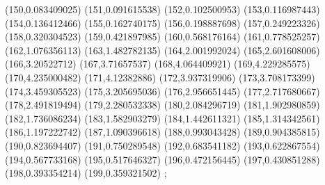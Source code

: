 {(150,0.083409025)
(151,0.091615538)
(152,0.102500953)
(153,0.116987443)
(154,0.136412466)
(155,0.162740175)
(156,0.198887698)
(157,0.249223326)
(158,0.320304523)
(159,0.421897985)
(160,0.568176164)
(161,0.778525257)
(162,1.076356113)
(163,1.482782135)
(164,2.001992024)
(165,2.601608006)
(166,3.20522712)
(167,3.71657537)
(168,4.064409921)
(169,4.229285575)
(170,4.235000482)
(171,4.12382886)
(172,3.937319906)
(173,3.708173399)
(174,3.459305523)
(175,3.205695036)
(176,2.956651445)
(177,2.717680667)
(178,2.491819494)
(179,2.280532338)
(180,2.084296719)
(181,1.902980859)
(182,1.736086234)
(183,1.582903279)
(184,1.442611321)
(185,1.314342561)
(186,1.197222742)
(187,1.090396618)
(188,0.993043428)
(189,0.904385815)
(190,0.823694407)
(191,0.750289548)
(192,0.683541182)
(193,0.622867554)
(194,0.567733168)
(195,0.517646327)
(196,0.472156445)
(197,0.430851288)
(198,0.393354214)
(199,0.359321502)
};